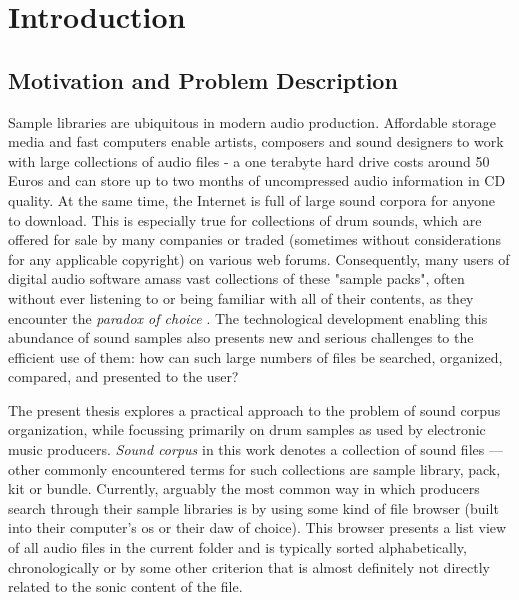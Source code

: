 
\section{Introduction}
\label{sec:introduction}

\subsection{Motivation and Problem Description}
\label{subsec:motivation}
Sample libraries are ubiquitous in modern audio production. Affordable storage
media and fast computers enable artists, composers and sound designers to work
with large collections of audio files - a one terabyte hard drive costs around
50 Euros and can store up to two months of uncompressed audio information in CD
quality. At the same time, the Internet is full of large sound corpora for
anyone to download. This is especially true for collections of drum sounds,
which are offered for sale by many companies or traded (sometimes without
considerations for any applicable copyright) on various web forums.
Consequently, many users of digital audio software amass vast collections of
these "sample packs", often without ever listening to or being familiar with
all of their contents, as they encounter the \textit{paradox of choice}
\citep{schwartz2004}. The technological development enabling this abundance of
sound samples also presents new and serious challenges to the efficient use of
them: how can such large numbers of files be searched, organized, compared, and
presented to the user?

\bigskip

The present thesis explores a practical approach to the problem of sound corpus
organization, while focussing primarily on drum samples as used by electronic
music producers. \textit{Sound corpus} in this work denotes a collection of
sound files --- other commonly encountered terms for such collections are sample
library, pack, kit or bundle. Currently, arguably the most common way in which
producers search through their sample libraries is by using some kind of file
browser (built into their computer's \gls{os} or their \gls{daw} of choice).
This browser presents a list view of all audio files in the current folder and
is typically sorted alphabetically, chronologically or by some other criterion
that is almost definitely not directly related to the sonic content of the file.

\smallskip

